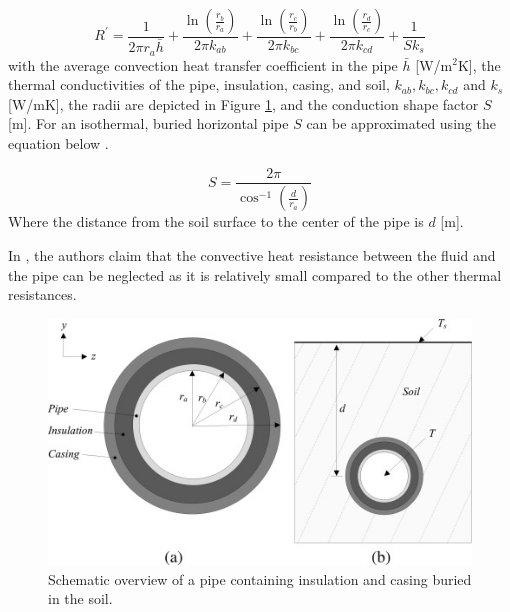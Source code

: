 \begin{equation}
R^{\prime}=\frac{1}{2 \pi r_a \bar{h}}+\frac{\ln \left(\frac{r_b}{r_a}\right)}{2 \pi k_{a b}}+\frac{\ln \left(\frac{r_c}{r_b}\right)}{2 \pi k_{b c}}+\frac{\ln \left(\frac{r_d}{r_c}\right)}{2 \pi k_{c d}}+\frac{1}{S k_s}
\end{equation}
with the average convection heat transfer coefficient in the pipe $\bar{h}$ [W/m$^2$K], the thermal conductivities of the pipe, insulation, casing, and soil, $k_{ab}, k_{bc}, k_{cd}$ and $k_s$ [W/mK], the radii are depicted in Figure \ref{fig::pipe}, and the conduction shape factor $S$ [m]. For an isothermal, buried horizontal pipe $S$ can be approximated using the equation below \cite{PipePDE}. 

\begin{equation}\label{eq::shapefactor}
S=\frac{2 \pi}{\cos ^{-1}\left(\frac{d}{r_a}\right)}
\end{equation}
Where the distance from the soil surface to the center of the pipe is $d$ [m]. 

In \cite{booklowT}, the authors claim that the convective heat resistance between the fluid and the pipe can be neglected as it is relatively small compared to the other thermal resistances.  

\begin{figure}
    \centering
    \includegraphics[width=0.5\linewidth]{Literature Survey - DCSC template/figuresLIT/pijpdoorsnede.jpg}
    \caption{Schematic overview of a pipe containing insulation and casing buried in the soil.}
    \label{fig::pipe}
\end{figure}  

